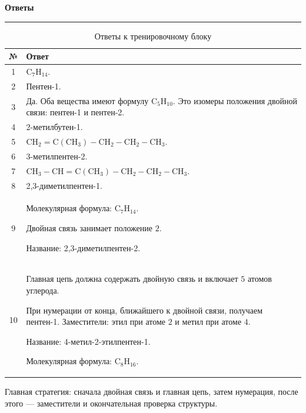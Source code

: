 \documentclass[a4paper,12pt]{article}
\begin{document}
\clearpage

\begin{center}
{\LARGE\bfseries\color{darkaccent}Ответы}

\vspace{0.25em}

{\color{linegray}\rule{0.82\linewidth}{0.8pt}}
\end{center}

\vspace{0.7em}

\renewcommand{\arraystretch}{1.45}

\begin{table}[ht]
\centering
\caption{Ответы к тренировочному блоку}
\begin{tabularx}{\linewidth}{@{}c X@{}}
\toprule
\textbf{№} & \textbf{Ответ} \\
\midrule

1 &
\(\mathrm{C_7H_{14}}\). \\

2 &
Пентен-1. \\

3 &
Да. Оба вещества имеют формулу \(\mathrm{C_5H_{10}}\).
Это изомеры положения двойной связи: пентен-1 и пентен-2. \\

4 &
2-метилбутен-1. \\

5 &
\(\mathrm{CH_2=C(CH_3)-CH_2-CH_2-CH_3}\). \\

6 &
3-метилпентен-2. \\

7 &
\(\mathrm{CH_3-CH=C(CH_3)-CH_2-CH_2-CH_3}\). \\

8 &
2,3-диметилпентен-1. \\

9 &
Молекулярная формула:
\(\mathrm{C_7H_{14}}\).

Двойная связь занимает положение \(2\).

Название:
2,3-диметилпентен-2. \\

10 &
Главная цепь должна содержать двойную связь и включает \(5\) атомов углерода.

При нумерации от конца, ближайшего к двойной связи, получаем пентен-1.
Заместители: этил при атоме \(2\) и метил при атоме \(4\).

Название:
4-метил-2-этилпентен-1.

Молекулярная формула:
\(\mathrm{C_8H_{16}}\). \\

\bottomrule
\end{tabularx}
\end{table}

\vfill

\begin{center}
{\small\color{textgray}
Главная стратегия: сначала двойная связь и главная цепь, затем нумерация,
после этого --- заместители и окончательная проверка структуры.}
\end{center}
\end{document}
